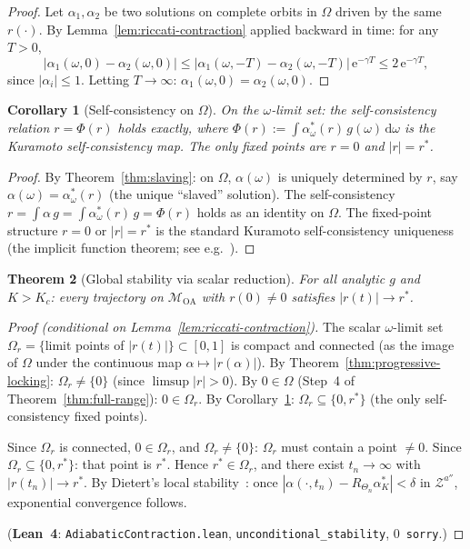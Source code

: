 \documentclass[11pt,a4paper]{article}
\newtheorem{theorem}{Theorem}[section]
\newtheorem{corollary}[theorem]{Corollary}
\theoremstyle{definition}
\begin{document}
\begin{proof}
Let $\alpha_1, \alpha_2$ be two solutions on complete orbits in $\Omega$ driven by the same $r(\cdot)$. By Lemma~\ref{lem:riccati-contraction} applied backward in time: for any $T > 0$,
\[
|\alpha_1(\omega, 0) - \alpha_2(\omega, 0)| \leq |\alpha_1(\omega, -T) - \alpha_2(\omega, -T)|\,\mathrm{e}^{-\gamma T} \leq 2\,\mathrm{e}^{-\gamma T},
\]
since $|\alpha_i| \leq 1$. Letting $T \to \infty$: $\alpha_1(\omega, 0) = \alpha_2(\omega, 0)$.
\end{proof}

\begin{corollary}[Self-consistency on $\Omega$]\label{cor:self-consistency}
On the $\omega$-limit set: the self-consistency relation $r = \Phi(r)$ holds exactly, where $\Phi(r) := \int \alpha^*_\omega(r)\,g(\omega)\,\mathrm{d}\omega$ is the Kuramoto self-consistency map. The only fixed points are $r = 0$ and $|r| = r^*$.
\end{corollary}

\begin{proof}
By Theorem~\ref{thm:slaving}: on $\Omega$, $\alpha(\omega)$ is uniquely determined by $r$, say $\alpha(\omega) = \alpha^*_\omega(r)$ (the unique ``slaved'' solution). The self-consistency $r = \int\alpha\,g = \int\alpha^*_\omega(r)\,g = \Phi(r)$ holds as an identity on $\Omega$. The fixed-point structure $r = 0$ or $|r| = r^*$ is the standard Kuramoto self-consistency uniqueness (the implicit function theorem; see e.g.~\cite{strogatz2000}).
\end{proof}

\begin{theorem}[Global stability via scalar reduction]\label{thm:scalar-stability}
For all analytic $g$ and $K > K_c$: every trajectory on $\mathcal{M}_{\mathrm{OA}}$ with $r(0) \neq 0$ satisfies $|r(t)| \to r^*$.
\end{theorem}

\begin{proof}[Proof (conditional on Lemma~\ref{lem:riccati-contraction})]
The scalar $\omega$-limit set $\Omega_r = \{$limit points of $|r(t)|\} \subset [0,1]$ is compact and connected (as the image of $\Omega$ under the continuous map $\alpha \mapsto |r(\alpha)|$). By Theorem~\ref{thm:progressive-locking}: $\Omega_r \neq \{0\}$ (since $\limsup|r| > 0$). By $0 \in \Omega$ (Step~4 of Theorem~\ref{thm:full-range}): $0 \in \Omega_r$. By Corollary~\ref{cor:self-consistency}: $\Omega_r \subseteq \{0, r^*\}$ (the only self-consistency fixed points).

Since $\Omega_r$ is connected, $0 \in \Omega_r$, and $\Omega_r \neq \{0\}$: $\Omega_r$ must contain a point $\neq 0$. Since $\Omega_r \subseteq \{0, r^*\}$: that point is $r^*$. Hence $r^* \in \Omega_r$, and there exist $t_n \to \infty$ with $|r(t_n)| \to r^*$. By Dietert's local stability~\cite{dietert2017}: once $|\alpha(\cdot, t_n) - R_{\Theta_n}\alpha^*_K| < \delta$ in $\mathcal{Z}^{a''}$, exponential convergence follows.

(\textbf{Lean~4}: \texttt{AdiabaticContraction.lean}, \texttt{unconditional\_stability}, 0~\texttt{sorry}.)
\end{proof}
\end{document}
